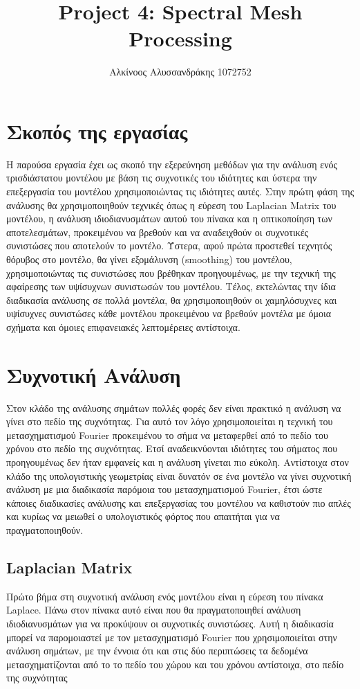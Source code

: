 \documentclass[draft]{article}
\title{Project 4: Spectral Mesh Processing}
\author{Αλκίνοος Αλυσσανδράκης 1072752}
\date{}
\begin{document}
\maketitle

\vfill
\tableofcontents
\vfill
\newpage

\section{Σκοπός της εργασίας}
Η παρούσα εργασία έχει ως σκοπό την εξερεύνηση μεθόδων για την ανάλυση ενός τρισδιάστατου
μοντέλου με βάση τις συχνοτικές του ιδιότητες και ύστερα την επεξεργασία του
μοντέλου χρησιμοποιώντας τις ιδιότητες αυτές. Στην πρώτη φάση της ανάλυσης θα
χρησιμοποιηθούν τεχνικές όπως η εύρεση του Laplacian Matrix του μοντέλου, η ανάλυση
ιδιοδιανυσμάτων αυτού του πίνακα και η οπτικοποίηση των αποτελεσμάτων, προκειμένου να
βρεθούν και να αναδειχθούν οι συχνοτικές συνιστώσες που αποτελούν το μοντέλο. Ύστερα,
αφού πρώτα προστεθεί τεχνητός θόρυβος στο μοντέλο, θα γίνει εξομάλυνση (smoothing) του
μοντέλου, χρησιμοποιώντας τις συνιστώσες που βρέθηκαν προηγουμένως, με την τεχνική της
αφαίρεσης των υψίσυχνων συνιστωσών του μοντέλου. Τέλος, εκτελώντας την ίδια διαδικασία
ανάλυσης σε πολλά μοντέλα, θα χρησιμοποιηθούν οι χαμηλόσυχνες και υψίσυχνες συνιστώσες
κάθε μοντέλου προκειμένου να βρεθούν μοντέλα με όμοια σχήματα και όμοιες επιφανειακές
λεπτομέρειες αντίστοιχα.

\section{Συχνοτική Ανάλυση}
Στον κλάδο της ανάλυσης σημάτων πολλές φορές δεν είναι πρακτικό η ανάλυση να γίνει στο
πεδίο της συχνότητας. Για αυτό τον λόγο χρησιμοποιείται η τεχνική του μετασχηματισμού
Fourier προκειμένου το σήμα να μεταφερθεί από το πεδίο του χρόνου στο πεδίο της
συχνότητας. Ετσί αναδεικνύονται ιδιότητες του σήματος που προηγουμένως δεν ήταν εμφανείς
και η ανάλυση γίνεται πιο εύκολη. Αντίστοιχα στον κλάδο της υπολογιστικής γεωμετρίας
είναι δυνατόν σε ένα μοντέλο να γίνει συχνοτική ανάλυση με μια διαδικασία παρόμοια του
μετασχηματισμού Fourier, έτσι ώστε κάποιες διαδικασίες ανάλυσης και επεξεργασίας του
μοντέλου να καθιστούν πιο απλές και κυρίως να μειωθεί ο υπολογιστικός φόρτος που
απαιτήται για να πραγματοποιηθούν.

\subsection{Laplacian Matrix}
Πρώτο βήμα στη συχνοτική ανάλυση ενός μοντέλου είναι η εύρεση του πίνακα Laplace. Πάνω
στον πίνακα αυτό είναι που θα πραγματοποιηθεί ανάλυση ιδιοδιανυσμάτων για να προκύψουν οι
συχνοτικές συνιστώσες. Αυτή η διαδικασία μπορεί να παρομοιαστεί με τον μετασχηματισμό
Fourier που χρησιμοποιείται στην ανάλυση σημάτων, με την έννοια ότι και στις δύο
περιπτώσεις τα δεδομένα μετασχηματίζονται από το το πεδίο του χώρου και του χρόνου
αντίστοιχα, στο πεδίο της συχνότητας
\end{document}
